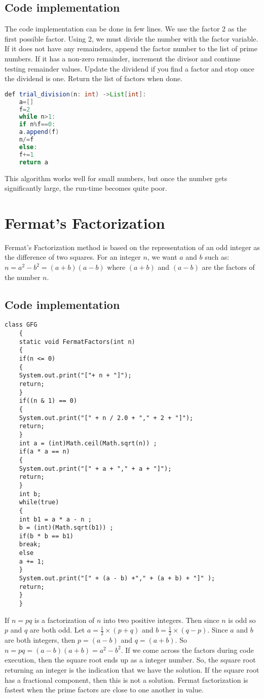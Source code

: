 \documentclass[]{article}
\begin{document}
	\subsection{Code implementation}
	The code implementation can be done in few lines. We use the factor 2 as the first possible factor. Using 2, we must divide the number with the factor variable. If it does not have any remainders, append the factor number to the list of prime numbers. If it has a non-zero remainder, increment the divisor and continue testing remainder values. Update the dividend if you find a factor and stop once the dividend is one. Return the list of factors when done.
	\\ 
	\begin{lstlisting}[language=Java]
	def trial_division(n: int) ->List[int]:
	a=[]
	f=2
	while n>1:
	if n%f==0:
	a.append(f)
	n/=f
	else:
	f+=1
	return a
	\end{lstlisting}
	This algorithm works well for small numbers, but once the number gets significantly large, the run-time becomes quite poor.
	
	\section{Fermat's Factorization}
	Fermat's Factorization method is based on the representation of an odd integer as the difference of two squares. For an integer $n$, we want $a$ and $b$ such as: $n=a^2-b^2=(a+b)(a-b)$ where $(a+b)$ and $(a-b)$ are the factors of the number $n$.
	\subsection{Code implementation}
	\begin{lstlisting}[basicstyle=\small]
	class GFG  
	{ 
	static void FermatFactors(int n) 
	{ 
	if(n <= 0) 
	{ 
	System.out.print("["+ n + "]"); 
	return; 
	} 
	if((n & 1) == 0) 
	{ 
	System.out.print("[" + n / 2.0 + "," + 2 + "]");  
	return; 
	} 
	int a = (int)Math.ceil(Math.sqrt(n)) ;  
	if(a * a == n)
	{ 
	System.out.print("[" + a + "," + a + "]");  
	return; 	
	} 
	int b; 
	while(true) 
	{ 
	int b1 = a * a - n ; 
	b = (int)(Math.sqrt(b1)) ; 
	if(b * b == b1) 
	break; 
	else
	a += 1; 
	} 
	System.out.print("[" + (a - b) +"," + (a + b) + "]" );  
	return; 
	}
	}
	\end{lstlisting}
	If $n=pq$ is a factorization of $n$ into two positive integers. Then since $n$ is odd so $p$ and $q$ are both odd. Let $a=\frac{1}{2}\times(p+q)$ and $b=\frac{1}{2}\times(q-p)$. Since $a$ and $b$ are both integers, then $p=(a-b)$ and $q=(a+b)$. So $n=pq=(a-b)(a+b)=a^2-b^2$. If we come across the factors during code execution, then the square root ends up as a integer number. So, the square root returning an integer is the indication that we have the solution. If the square root has a fractional component, then this is not a solution. Fermat factorization is fastest when the prime factors are close to one another in value.
	
\end{document}

